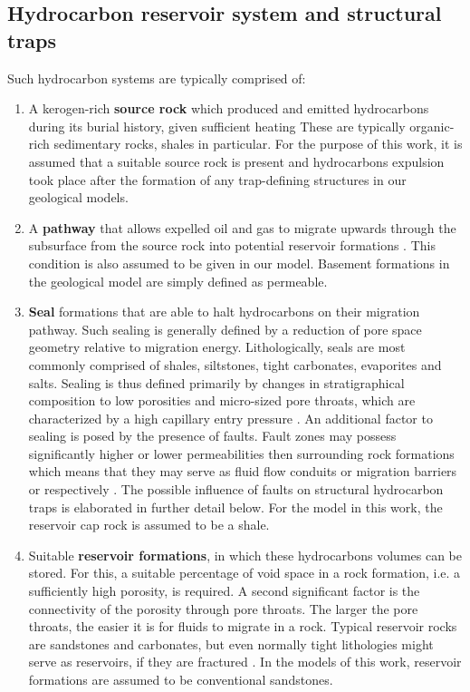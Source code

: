         \subsection{Hydrocarbon reservoir system and structural traps}
        Such hydrocarbon systems are typically comprised of:
        \begin{enumerate}
        	\item A kerogen-rich \textbf{source rock} which produced and emitted hydrocarbons during its burial history, given sufficient heating \citep{dolson2016basics} These are typically organic-rich sedimentary rocks, shales in particular. For the purpose of this work, it is assumed that a  suitable source rock is present and hydrocarbons expulsion took place after the formation of any trap-defining structures in our geological models.
        	\item A \textbf{pathway} that allows expelled oil and gas to migrate upwards through the subsurface from the source rock into potential reservoir formations \citep{dolson2016basics}. This condition is also assumed to be given in our model. Basement formations in the geological model are simply defined as permeable.
        	\item \textbf{Seal} formations that are able to halt hydrocarbons on their migration pathway. Such sealing is generally defined by a reduction of pore space geometry relative to migration energy. Lithologically, seals are most commonly comprised of shales, siltstones, tight carbonates, evaporites and salts. Sealing is thus defined primarily by changes in stratigraphical composition to low porosities and micro-sized pore throats, which are characterized by a high capillary entry pressure \citep{dolson2016basics, dolson2016quantifying}. An additional factor to sealing is posed by the presence of faults. Fault zones may possess significantly higher or lower permeabilities then surrounding rock formations which means that they may serve as fluid flow conduits or migration barriers or respectively \citep{van2003lateral, sorkhabi2005place}. The possible influence of faults on structural hydrocarbon traps is elaborated in further detail below. For the model in this work, the reservoir cap rock is assumed to be a shale.
        	\item Suitable \textbf{reservoir formations}, in which these hydrocarbons volumes can be stored. For this, a suitable percentage of void space in a rock formation, i.e. a sufficiently high porosity, is required. A second significant factor is the connectivity of the porosity through pore throats. The larger the pore throats, the easier it is for fluids to migrate in a rock. Typical reservoir rocks are sandstones and carbonates, but even normally tight lithologies might serve as reservoirs, if they are fractured \citep{dolson2016basics}. In the models of this work, reservoir formations are assumed to be conventional sandstones.
        \end{enumerate}

